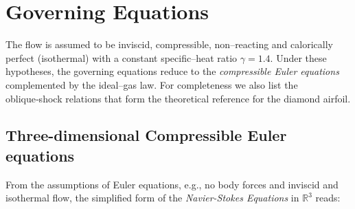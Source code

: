 \documentclass[11pt]{article}
\begin{document}





\section{Governing Equations}
The flow is assumed to be inviscid, compressible, non–reacting and
calorically perfect (isothermal) with a constant specific–heat ratio
$\gamma = 1.4$.  Under these hypotheses, the governing equations reduce
to the \emph{compressible Euler equations} complemented by the ideal–gas
law.  For completeness we also list the oblique‑shock relations that
form the theoretical reference for the diamond airfoil.

\subsection{Three-dimensional Compressible Euler equations}
From the assumptions of Euler equations, e.g., no body forces and inviscid and isothermal flow, the simplified form of the \textit{Navier-Stokes Equations} in \(\mathbb{R}^{3}\) reads:
\end{document}
